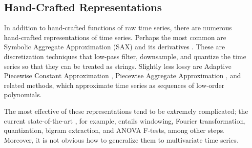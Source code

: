 \subsection{Hand-Crafted Representations}

In addition to hand-crafted functions of raw time series, there are numerous hand-crafted representations of time series. Perhaps the most common are Symbolic Aggregate Approximation (SAX) \citep{sax} and its derivatives \citep{isax2,saxVSM}. These are discretization techniques that low-pass filter, downsample, and quantize the time series so that they can be treated as strings. Slightly less lossy are Adaptive Piecewise Constant Approximation \citep{apca}, Piecewise Aggregate Approximation \citep{paa}, and related methods, which approximate time series as sequences of low-order polynomials.


The most effective of these representations tend to be extremely complicated; the current state-of-the-art \citep{weasel}, for example, entails windowing, Fourier transformation, quantization, bigram extraction, and ANOVA F-tests, among other steps. Moreover, it is not obvious how to generalize them to multivariate time series.



